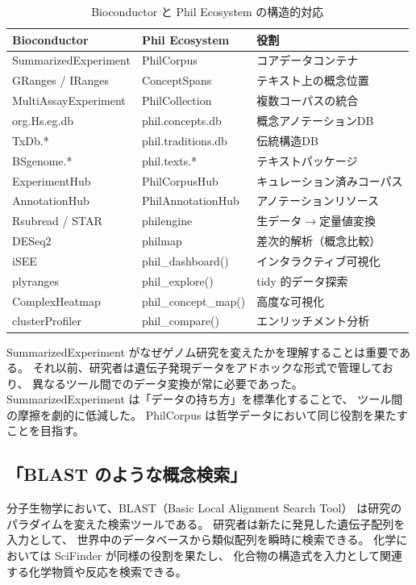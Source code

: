 \documentclass[a4paper,11pt]{ltjsarticle}
\begin{document}
\begin{table}[H]
\centering
\caption{Bioconductor と Phil Ecosystem の構造的対応}
\label{tab:bioc-phil}
\small
\begin{tabular}{lll}
\toprule
\textbf{Bioconductor} & \textbf{Phil Ecosystem} & \textbf{役割} \\
\midrule
SummarizedExperiment & PhilCorpus & コアデータコンテナ \\
GRanges / IRanges & ConceptSpans & テキスト上の概念位置 \\
MultiAssayExperiment & PhilCollection & 複数コーパスの統合 \\
org.Hs.eg.db & phil.concepts.db & 概念アノテーションDB \\
TxDb.* & phil.traditions.db & 伝統構造DB \\
BSgenome.* & phil.texts.* & テキストパッケージ \\
ExperimentHub & PhilCorpusHub & キュレーション済みコーパス \\
AnnotationHub & PhilAnnotationHub & アノテーションリソース \\
Rsubread / STAR & philengine & 生データ$\to$定量値変換 \\
DESeq2 & philmap & 差次的解析（概念比較） \\
iSEE & phil\_dashboard() & インタラクティブ可視化 \\
plyranges & phil\_explore() & tidy 的データ探索 \\
ComplexHeatmap & phil\_concept\_map() & 高度な可視化 \\
clusterProfiler & phil\_compare() & エンリッチメント分析 \\
\bottomrule
\end{tabular}
\end{table}

SummarizedExperiment がなぜゲノム研究を変えたかを理解することは重要である。
それ以前、研究者は遺伝子発現データをアドホックな形式で管理しており、
異なるツール間でのデータ変換が常に必要であった。
SummarizedExperiment は「データの持ち方」を標準化することで、
ツール間の摩擦を劇的に低減した。
PhilCorpus は哲学データにおいて同じ役割を果たすことを目指す。

\subsection{「BLAST のような概念検索」}

分子生物学において、BLAST（Basic Local Alignment Search Tool）\cite{altschul1990}
は研究のパラダイムを変えた検索ツールである。
研究者は新たに発見した遺伝子配列を入力として、
世界中のデータベースから類似配列を瞬時に検索できる。
化学においては SciFinder\cite{scifinder} が同様の役割を果たし、
化合物の構造式を入力として関連する化学物質や反応を検索できる。
\end{document}
